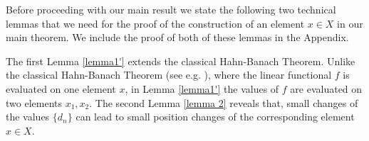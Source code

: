 \documentclass[12pt, reqno]{amsart}
\newtheorem{theorem}{Theorem}[section]
\theoremstyle{definition}
\theoremstyle{remark}
\numberwithin{equation}{section}
\begin{document}

Before proceeding with our main result  we state the following two technical lemmas that we need for the  proof of  the construction of an element $x\in X$ in our main theorem. We include the proof of both of these lemmas in the Appendix.

The first Lemma \ref{lemma1'} 
extends the classical Hahn-Banach Theorem. Unlike the classical Hahn-Banach Theorem (see e.g. \cite[p. 63]{Dunford}), where the linear functional $f$ is evaluated on one element $x$, in  Lemma \ref{lemma1'} the values of $f$ are evaluated on two elements $x_1,x_2$. The second  Lemma \ref{lemma 2}  reveals that, small changes of the values $\{d_n\}$ can lead to small position changes of the corresponding element $x\in X$.
\end{document}
